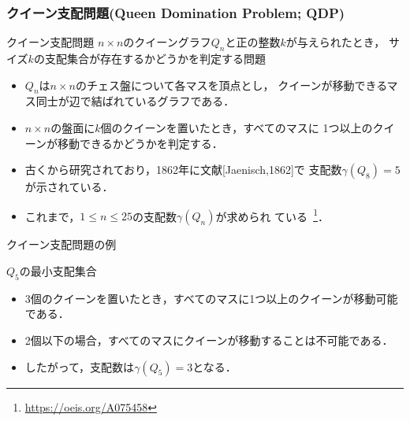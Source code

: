 \documentclass[dvipdfmx,10pt]{beamer}
\begin{document}
%
%
\begin{frame}\frametitle{クイーン支配問題(Queen Domination Problem; QDP)}

  \begin{alertblock}{クイーン支配問題}\centering
    $n\times n$のクイーングラフ$Q_n$と正の整数$k$が与えられたとき，
    サイズ$k$の支配集合が存在するかどうかを判定する問題
 \end{alertblock}
 \vfill
 \begin{itemize}
 \item $Q_n$は$n\times n$のチェス盤について各マスを頂点とし，
   クイーンが移動できるマス同士が辺で結ばれているグラフである．
 \item $n\times n$の盤面に$k$個のクイーンを置いたとき，すべてのマスに
       1つ以上のクイーンが移動できるかどうかを判定する．
 \item 古くから研究されており，1862年に文献[Jaenisch,1862]で
   支配数$\gamma(Q_8)=5$が示されている．
 \item これまで，$1\leq n\leq 25$の支配数$\gamma(Q_n)$が求められ
   ている~\footnote{\url{https://oeis.org/A075458}}．
 \end{itemize}
\end{frame}
 
 
%
%

\begin{frame}{クイーン支配問題の例}
  \begin{exampleblock}{$Q_5$の最小支配集合}
  \begin{center}
   \scalebox{1.3}{
   
   }
  \end{center}
 \end{exampleblock}
 \vfill
 \begin{itemize}
  \item 3個のクイーンを置いたとき，すべてのマスに1つ以上のクイーンが移動可能である．
  \item 2個以下の場合，すべてのマスにクイーンが移動することは不可能である．
  \item したがって，支配数は$\gamma(Q_{5})=3$となる．
 \end{itemize}
\end{frame}



%
%
\end{document}
